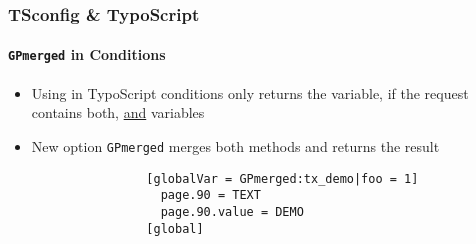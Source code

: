 
\begin{frame}[fragile]
	\frametitle{TSconfig \& TypoScript}
	\framesubtitle{\texttt{GPmerged} in Conditions}

	\begin{itemize}

		\item Using  in TypoScript conditions only returns the 
			variable, if the request contains both,  \underline{and}
			 variables

		\item New option \texttt{GPmerged} merges both methods and returns the result

			\begin{lstlisting}
				[globalVar = GPmerged:tx_demo|foo = 1]
				  page.90 = TEXT
				  page.90.value = DEMO
				[global]
			\end{lstlisting}

	\end{itemize}

\end{frame}


